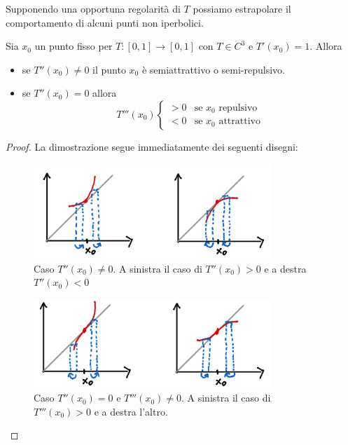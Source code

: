 \newpage
Supponendo una opportuna regolarit\`a di $T$ possiamo estrapolare il comportamento di alcuni punti non iperbolici. 
\begin{proposition}\label{CriterioPuntiNonIperboliciDerivataPositiva}
Sia $x_0$ un punto fisso per $T:[0,1]\to[0,1]$ con $T\in C^3$ e $T'(x_0)=1$. Allora
\begin{itemize}
\item se $T''(x_0)\neq 0$ il punto $x_0$ \`e semiattrattivo o semi-repulsivo.
\item se $T''(x_0)=0$ allora
\[T'''(x_0)\begin{cases}
>0 & \text{se }x_0\text{ repulsivo}\\
<0 & \text{se }x_0\text{ attrattivo}
\end{cases}\]
\end{itemize}
\end{proposition}


\begin{proof}
La dimostrazione segue immediatamente dei seguenti disegni:

\begin{figure}[!htb]
	\centering
	\includegraphics[width=9cm]{Immagini/T''_non_nulla.png}
	\caption{Caso $T''(x_0)\neq 0$. A sinistra il caso di $T''(x_0)>0$ e a destra $T''(x_0)<0$}
\end{figure}

\begin{figure}[!htb]
	\centering
	\includegraphics[width=9cm]{Immagini/T'''_non_nulla.png}
	\caption{Caso $T''(x_0)=0$ e $T'''(x_0)\neq 0$. A sinistra il caso di $T'''(x_0)>0$ e a destra l'altro.}
\end{figure}
\end{proof}
	
